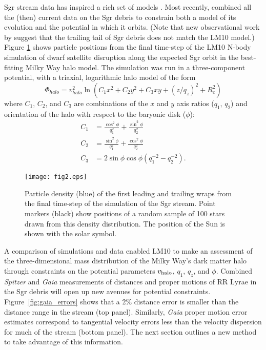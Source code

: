 \documentclass{emulateapj}
\begin{document}
Sgr stream data has inspired a rich set of  models 
\citep[e.g.,][]{johnston99b, fellhauer06}.
Most recently, \citet[][hereafter LM10]{law10} combined all
the (then) current data on the Sgr debris to constrain both a model of its evolution
and the potential in which it orbits. (Note that new observational work by 
\citet{belokurov13} suggest that the trailing tail of Sgr debris does not
match the LM10 model.)
Figure \ref{fig:lm10} shows particle positions
from the final time-step of the LM10 N-body
simulation of dwarf satellite disruption along the expected Sgr orbit
in the best-fitting Milky Way halo model. The simulation was
run in a three-component potential, with a triaxial, logarithmic halo
model of the form
\begin{equation}
  \Phi_{halo} = v_{halo}^2 \ln(C_1 x^2 + C_2 y^2 + C_3 xy + (z/q_z)^2 + R_c^2)
\end{equation}
where $C_1$, $C_2$, and $C_3$ are combinations of the $x$ and $y$ axis
ratios ($q_1$, $q_2$) and orientation of the halo with respect to the
baryonic disk ($\phi$):
\begin{align}
  C_1 &= \frac{\cos^2\phi}{q_1^2} + \frac{\sin^2\phi}{q_2^2}\\
  C_2 &= \frac{\sin^2\phi}{q_1^2} + \frac{\cos^2\phi}{q_2^2}\\
  C_3 &= 2\sin\phi\cos\phi \left(q_1^{-2} - q_2^{-2}\right).
\end{align}

\begin{figure}[h]
\begin{center}
\texttt{[image: fig2.eps]}
\caption{ Particle density (blue) of the first leading and trailing wraps from the final time-step of the \citet{law10} simulation of the Sgr stream. Point markers (black) show positions of a random sample of 100 stars drawn from this density distribution. The position of the Sun is shown with the solar symbol. }\label{fig:lm10}
\end{center}
\end{figure}

A comparison of simulations and data enabled LM10 to make an assessment of the three-dimensional 
mass distribution of the Milky Way's dark matter
halo through constraints on the potential parameters $v_{\rm halo}$, $q_1$, $q_z$, and $\phi$. Combined {\it Spitzer} and {\it Gaia} measurements of distances and proper motions
of RR Lyrae in the Sgr debris will open up new avenues for potential constraints. Figure~\ref{fig:gaia_errors} shows that a 2\% distance error is smaller than the 
distance range in the stream (top panel). Similarly, {\it Gaia} proper motion
error estimates correspond to tangential velocity errors less than the velocity
dispersion for much of the stream (bottom panel). The next section outlines a 
new method to take advantage of this information. 
\end{document}
